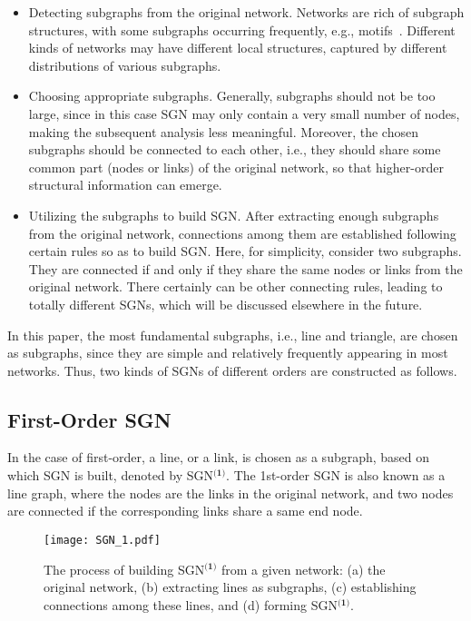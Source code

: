 \documentclass[10pt,journal,compsoc]{IEEEtran}
\begin{document}
\begin{itemize}
\item Detecting subgraphs from the original network. Networks are rich of subgraph structures, with some subgraphs occurring frequently, e.g., motifs~\cite{wernicke2006efficient}. Different kinds of networks may have different local structures, captured by different distributions of various subgraphs.
\item Choosing appropriate subgraphs. Generally, subgraphs should not be too large, since in this case SGN may only contain a very small number of nodes, making the subsequent analysis less meaningful. Moreover, the chosen subgraphs should be connected to each other, i.e., they should share some common part (nodes or links) of the original network, so that higher-order structural information can emerge.
\item Utilizing the subgraphs to build SGN. After extracting enough subgraphs from the original network, connections among them are established following certain rules so as to build SGN. Here, for simplicity, consider two subgraphs. They are connected if and only if they share the same nodes or links from the original network. There certainly can be other connecting rules, leading to totally different SGNs, which will be discussed elsewhere in the future.
\end{itemize}

In this paper, the most fundamental subgraphs, i.e., line and triangle, are chosen as subgraphs, since they are simple and relatively frequently appearing in most networks. Thus, two kinds of SGNs of different orders are constructed as follows.

\subsection{First-Order SGN}
In the case of first-order, a line, or a link, is chosen as a subgraph, based on which SGN is built, denoted by SGN$^{\textbf{(1)}}$. The 1st-order SGN is also known as a line graph, where the nodes are the links in the original network, and two nodes are connected if the corresponding links share a same end node.

\begin{figure}[!t]
	\centering
	\texttt{[image: SGN\_1.pdf]}
	\caption{The process of building SGN$^{\textbf{(1)}}$ from a given network: (a) the original network, (b) extracting lines as subgraphs, (c) establishing connections among these lines, and (d) forming SGN$^{\textbf{(1)}}$.}
	\label{fig:line}
\end{figure}
\end{document}
